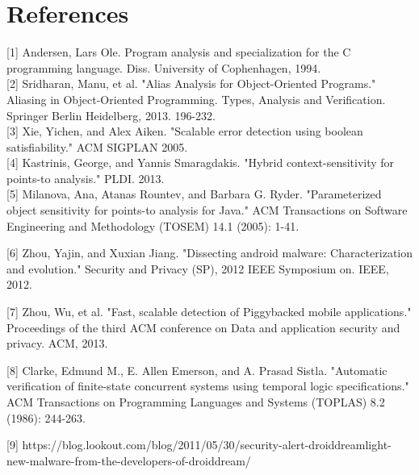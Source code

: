\documentclass{sig-alternate}
\begin{document}
%

%
%
\section{References}

[1] Andersen, Lars Ole. Program analysis and specialization for the C programming language. Diss. University of Cophenhagen, 1994.\\

[2] Sridharan, Manu, et al. "Alias Analysis for Object-Oriented Programs." Aliasing in Object-Oriented Programming. Types, Analysis and Verification. Springer Berlin Heidelberg, 2013. 196-232.\\

[3] Xie, Yichen, and Alex Aiken. "Scalable error detection using boolean satisfiability." ACM SIGPLAN 2005.\\

[4] Kastrinis, George, and Yannis Smaragdakis. "Hybrid context-sensitivity for points-to analysis." PLDI. 2013.\\

[5] Milanova, Ana, Atanas Rountev, and Barbara G. Ryder. "Parameterized object sensitivity for points-to analysis for Java." ACM Transactions on Software Engineering and Methodology (TOSEM) 14.1 (2005): 1-41.

[6] Zhou, Yajin, and Xuxian Jiang. "Dissecting android malware: Characterization and evolution." Security and Privacy (SP), 2012 IEEE Symposium on. IEEE, 2012.

[7] Zhou, Wu, et al. "Fast, scalable detection of Piggybacked mobile applications." Proceedings of the third ACM conference on Data and application security and privacy. ACM, 2013.

[8] Clarke, Edmund M., E. Allen Emerson, and A. Prasad Sistla. "Automatic verification of finite-state concurrent systems using temporal logic specifications." ACM Transactions on Programming Languages and Systems (TOPLAS) 8.2 (1986): 244-263.

[9] https://blog.lookout.com/blog/2011/05/30/security-alert-droiddreamlight-new-malware-from-the-developers-of-droiddream/
\end{document}
